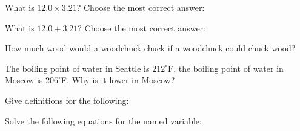 \documentclass[11pt,addpoints]{exam}   	%
\begin{document}
\begin{questions}
\vspace{.2in}

\question[2]
What is $ 12.0 \times 3.21 $? Choose the most correct answer:

\begin{choices}
\end{choices}
\vspace{.2in}

\question[2]
What is $ 12.0 + 3.21 $? Choose the most correct answer:

\begin{choices}
\end{choices}
\vspace{.2in}

\question[1]
How much wood would a woodchuck chuck if a woodchuck could chuck wood?
\vspace{.2in}

\question[1]
The boiling point of water in Seattle is $212^{\circ}$F, the boiling point of water in Moscow is $206^{\circ}$F. Why is it lower in Moscow?
\vspace{.2in}

\question
Give definitions for the following:
\vspace{.2in}
\pagebreak

\question
Solve the following equations for the named variable:
\begin{parts}

\end{parts}
\end{questions}
\end{document}
